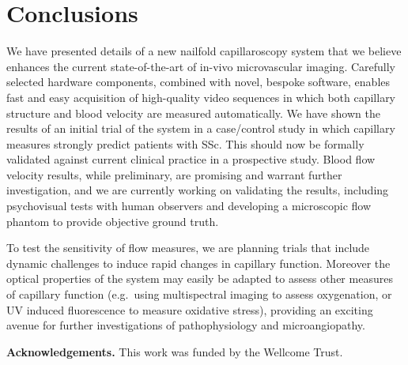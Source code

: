 \documentclass[runningheads,a4paper]{llncs}
\def\eg{e.g.}
\begin{document}
\section{Conclusions}
\label{s:conclusions}
We have presented details of a new nailfold capillaroscopy system that we believe enhances the current state-of-the-art of in-vivo microvascular imaging. Carefully selected hardware components, combined with novel, bespoke software, enables fast and easy acquisition of high-quality video sequences in which both capillary structure and blood velocity are measured automatically. We have shown the results of an initial trial of the system in a case/control study in which capillary measures strongly predict patients with SSc. This should now be formally validated against current clinical practice in a prospective study. Blood flow velocity results, while preliminary, are promising and warrant further investigation, and we are currently working on validating the results, including psychovisual tests with human observers and developing a microscopic flow phantom to provide objective ground truth.

To test the sensitivity of flow measures, we are planning trials that include dynamic challenges to induce rapid changes in capillary function. Moreover the optical properties of the system may easily be adapted to assess other measures of capillary function (\eg~using multispectral imaging to assess oxygenation, or UV induced fluorescence  to measure oxidative stress), providing an exciting avenue for further investigations of pathophysiology and microangiopathy. 

\textbf{Acknowledgements.}
This work was funded by the Wellcome Trust.



\end{document}
